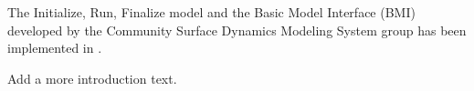 The Initialize, Run, Finalize model and the Basic Model Interface (BMI) developed by the Community Surface Dynamics Modeling System group \citep{PECKHAM20133} has been implemented in \mf.

Add a more introduction text.